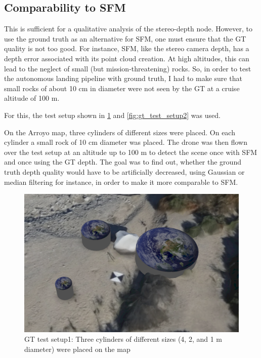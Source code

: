 \subsection{Comparability to SFM}

This is sufficient for a qualitative analysis of the stereo-depth node. However, to use the ground truth as an alternative for SFM, one must ensure that the GT quality is not too good. For instance, SFM, like the stereo camera depth, has a depth error associated with its point cloud creation. At high altitudes, this can lead to the neglect of small (but mission-threatening) rocks. So, in order to test the autonomous landing pipeline with ground truth, I had to make sure that small rocks of about 10 cm in diameter were not seen by the GT at a cruise altitude of 100 m.

For this, the test setup shown in \cref{fig:gt_test_setup1} and \cref{fig:gt_test_setup2} was used.

On the Arroyo map, three cylinders of different sizes were placed. On each cylinder a small rock of 10 cm diameter was placed. The drone was then flown over the test setup at an altitude up to 100 m to detect the scene once with SFM and once using the GT depth. The goal was to find out, whether the ground truth depth quality would have to be artificially decreased, using Gaussian or median filtering for instance, in order to make it more comparable to SFM.
\clearpage %

\begin{figure}[ht]
\centering
\includegraphics[scale=0.3]{images/methodology/test_setup1.png}
\caption{GT test setup1: Three cylinders of different sizes (4, 2, and 1 m diameter) were placed on the map}
\label{fig:gt_test_setup1}
\end{figure}


